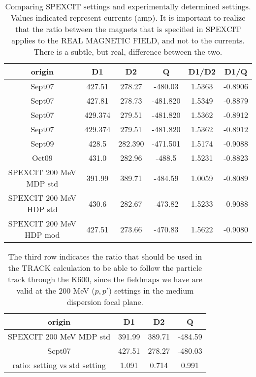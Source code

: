 \documentclass[11pt]{report}
\begin{document}
\begin{table}[!ht]
\centering
\begin{tabular}{|c|c|c|c|c|c|}
\hline
origin & D1 & D2 & Q & D1/D2 & D1/Q \\
\hline
\hline
Sept07 & 427.51   & 278.27  & -480.03   & 1.5363 & 	-0.8906 \\
Sept07 & 427.81   & 278.73  & -481.820  & 1.5349 & 	-0.8879 \\
Sept07 & 429.374  & 279.51  & -481.820  & 1.5362 & 	-0.8912 \\
Sept07 & 429.374  & 279.51  & -481.820  & 1.5362 & 	-0.8912 \\
Sept09 & 428.5    & 282.390 & -471.501  & 1.5174 &      -0.9088 \\
Oct09  & 431.0    & 282.96  & -488.5    & 1.5231 &      -0.8823 \\

\hline

SPEXCIT 200 MeV MDP std & 391.99 & 389.71 & 	-484.59	 & 1.0059 & 	-0.8089 \\
SPEXCIT 200 MeV HDP std & 430.6	 & 282.67 & 	-473.82	 & 1.5233 & 	-0.9088  \\
SPEXCIT 200 MeV HDP mod & 427.51 & 273.66 & 	-470.83	 & 1.5622 & 	-0.9080  \\

\hline
\end{tabular}
\caption{Comparing SPEXCIT settings and experimentally determined settings. 
Values indicated represent currents (amp). It is important to realize that 
the ratio between the magnets that is specified in SPEXCIT applies to the REAL MAGNETIC FIELD, and
not to the currents. There is a subtle, but real, difference between the two.}
\label{table:zerod-K600-settings2}
\end{table}


\begin{table}[!ht]
\centering
\begin{tabular}{|c|c|c|c|}
\hline
origin & D1 & D2 & Q  \\
\hline
\hline
SPEXCIT 200 MeV MDP std &	391.99 &	389.71 &	-484.59	 \\
Sept07                  &	427.51 &	278.27 &	-480.03	 \\
ratio: setting vs std setting &	1.091  &	0.714  &	0.991	\\
\hline
\end{tabular}
\caption{The third row indicates the ratio that should be used in the TRACK calculation
to be able to follow the particle track through the K600, since the fieldmaps we have
are valid at the 200 MeV ($p,p'$) settings in the medium dispersion focal plane.}
\label{table:zerod-K600-settings3}
\end{table}
\end{document}
